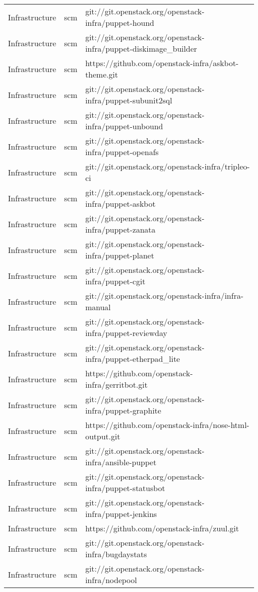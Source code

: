 \begin{center}
\begin{longtable}{|p{4cm}|p{1cm}|p{10cm}|}
Infrastructure&scm&git://git.openstack.org/openstack-infra/puppet-hound\\ 
Infrastructure&scm&git://git.openstack.org/openstack-infra/puppet-diskimage\_builder\\ 
Infrastructure&scm&https://github.com/openstack-infra/askbot-theme.git\\ 
Infrastructure&scm&git://git.openstack.org/openstack-infra/puppet-subunit2sql\\ 
Infrastructure&scm&git://git.openstack.org/openstack-infra/puppet-unbound\\ 
Infrastructure&scm&git://git.openstack.org/openstack-infra/puppet-openafs\\ 
Infrastructure&scm&git://git.openstack.org/openstack-infra/tripleo-ci\\ 
Infrastructure&scm&git://git.openstack.org/openstack-infra/puppet-askbot\\ 
Infrastructure&scm&git://git.openstack.org/openstack-infra/puppet-zanata\\ 
Infrastructure&scm&git://git.openstack.org/openstack-infra/puppet-planet\\ 
Infrastructure&scm&git://git.openstack.org/openstack-infra/puppet-cgit\\ 
Infrastructure&scm&git://git.openstack.org/openstack-infra/infra-manual\\ 
Infrastructure&scm&git://git.openstack.org/openstack-infra/puppet-reviewday\\ 
Infrastructure&scm&git://git.openstack.org/openstack-infra/puppet-etherpad\_lite\\ 
Infrastructure&scm&https://github.com/openstack-infra/gerritbot.git\\ 
Infrastructure&scm&git://git.openstack.org/openstack-infra/puppet-graphite\\ 
Infrastructure&scm&https://github.com/openstack-infra/nose-html-output.git\\ 
Infrastructure&scm&git://git.openstack.org/openstack-infra/ansible-puppet\\ 
Infrastructure&scm&git://git.openstack.org/openstack-infra/puppet-statusbot\\ 
Infrastructure&scm&git://git.openstack.org/openstack-infra/puppet-jenkins\\ 
Infrastructure&scm&https://github.com/openstack-infra/zuul.git\\ 
Infrastructure&scm&git://git.openstack.org/openstack-infra/bugdaystats\\ 
Infrastructure&scm&git://git.openstack.org/openstack-infra/nodepool\\ 

\end{longtable}
\end{center}
